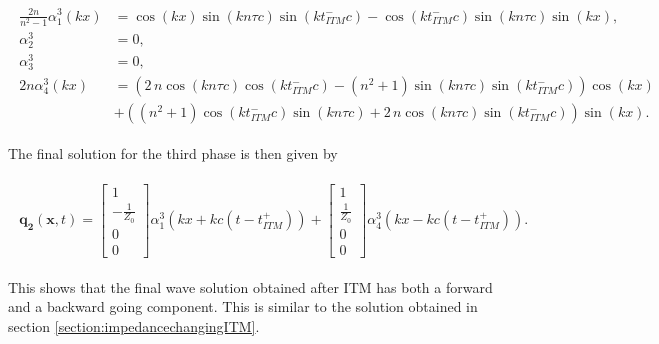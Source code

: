 \begin{align}
    \begin{split}
        \frac{2n}{n^2 - 1} \alpha_1^3\left(kx\right) &=  {\cos\left(k x\right) \sin\left(k n \tau c\right) \sin\left(k \mathit{t_{ITM}^-} c\right) - \cos\left(k \mathit{t_{ITM}^-} c\right) \sin\left(k n \tau c\right) \sin\left(k x\right)}, \\
        \alpha_2^3 &= 0, \\
        \alpha_3^3 &= 0, \\
        {2n} \alpha_4^3 \left(kx\right) &= {\left(2 \, n \cos\left(k n \tau c\right) \cos\left(k \mathit{t_{ITM}^-} c\right) - {\left(n^{2} + 1\right)} \sin\left(k n \tau c\right) \sin\left(k \mathit{t_{ITM}^-} c\right)\right)} \cos\left(k x\right) \\
        &+ {\left({\left(n^{2} + 1\right)} \cos\left(k \mathit{t_{ITM}^-} c\right) \sin\left(k n \tau c\right) + 2 \, n \cos\left(k n \tau c\right) \sin\left(k \mathit{t_{ITM}^-} c\right)\right)} \sin\left(k x\right) .
    \end{split}
\end{align}

The final solution for the third phase is then given by

\begin{align}
    \begin{split}
        \mathbf{q_2}\left(\mathbf{x}, t\right) = \begin{bmatrix}
            1 \\
            -\frac{1}{Z_0} \\
            0 \\
            0
        \end{bmatrix} \alpha_1^3 \left(kx + kc \left(t - t_{ITM}^+\right)\right) + 
        \begin{bmatrix}
            1 \\
            \frac{1}{Z_0} \\
            0 \\
            0
        \end{bmatrix} \alpha_4^3 \left(kx - kc \left(t - t_{ITM}^+\right)\right) .
    \end{split}
\end{align}

This shows that the final wave solution obtained after \ac{ITM} has both a forward and a backward going component. This is similar to the solution obtained in section \ref{section:impedancechangingITM}.